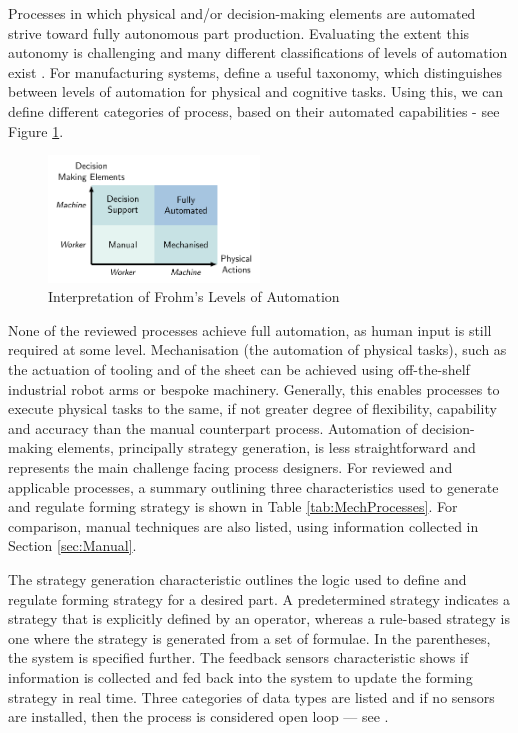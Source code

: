 Processes in which physical and/or decision-making elements are automated strive toward fully autonomous part production. Evaluating the extent this autonomy is challenging and many different classifications of levels of automation exist \citep{Vagia2015AProposed}. For manufacturing systems, \cite{Frohm2008LevelsManufacturing} define a useful taxonomy, which distinguishes between levels of automation for physical and cognitive tasks. Using this, we can define different categories of process, based on their automated capabilities - see Figure \ref{fig:LoA}. 

\begin{figure}[h]
    \centering
    \includegraphics[width=0.5\textwidth]{Diagrams/LoADiagram.pdf}
    \caption{Interpretation of Frohm's Levels of Automation \citep{Frohm2008LevelsManufacturing}}
    \label{fig:LoA}
\end{figure}

None of the reviewed processes achieve full automation, as human input is still required at some level. Mechanisation (the automation of physical tasks), such as the actuation of tooling and of the sheet can be achieved using off-the-shelf industrial robot arms or bespoke machinery. Generally, this enables processes to execute physical tasks to the same, if not greater degree of flexibility, capability and accuracy than the manual counterpart process. Automation of decision-making elements, principally strategy generation, is less straightforward and represents the main challenge facing process designers. For reviewed and applicable processes, a summary outlining three characteristics used to generate and regulate forming strategy is shown in Table \ref{tab:MechProcesses}. For comparison, manual techniques are also listed, using information collected in Section \ref{sec:Manual}.

The strategy generation characteristic outlines the logic used to define and regulate forming strategy for a desired part. A predetermined strategy indicates a strategy that is explicitly defined by an operator, whereas a rule-based strategy is one where the strategy is generated from a set of formulae. In the parentheses, the system is specified further.   The feedback sensors characteristic shows if information is collected and fed back into the system to update the forming strategy in real time. Three categories of data types are listed and if no sensors are installed, then the process is considered open loop --- see \cite{Polyblank2014Closed-loopProspectus}.      

